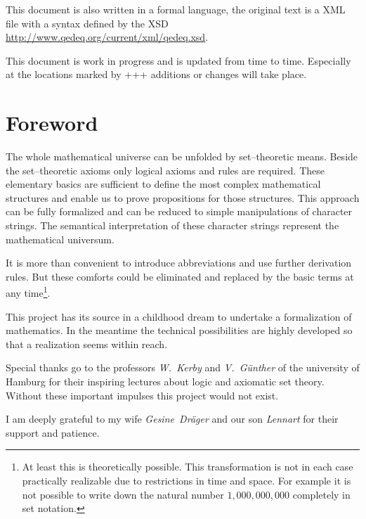 \documentclass[a4paper,german,10pt,twoside]{book}
\theoremstyle{definition}
\theoremstyle{remark}
\begin{document}
\par
This document is also written in a formal language, the original text is a XML file with a syntax defined by the XSD \url{http://www.qedeq.org/current/xml/qedeq.xsd}.

\par
This document is work in progress and is updated from time to time. Especially at the locations marked by {\glqq+++\grqq} additions or changes will take place.


\chapter*{Foreword} \label{chapter2} \hypertarget{chapter2}{}

The whole mathematical universe can be unfolded by set--theoretic means. Beside the set--theoretic axioms only logical axioms and rules are required. These elementary basics are sufficient to define the most complex mathematical structures and enable us to prove propositions for those structures. This approach can be fully formalized and can be reduced to simple manipulations of character strings. The semantical interpretation of these character strings represent the mathematical universum.

\par
It is more than convenient to introduce abbreviations and use further derivation rules. But these comforts could be eliminated and replaced by the basic terms at any time\footnote{At least this is theoretically possible. This transformation is not in each case practically realizable due to restrictions in time and space. For example it is not possible to write down the
natural number $1,000,000,000$ completely in set notation.}.

\par
This project has its source in a childhood dream to undertake a formalization of mathematics. In the meantime the technical possibilities are highly developed so that a realization seems within reach.

\par
Special thanks go to the professors \emph{W.~Kerby} and \emph{V.~G{\"u}nther} of the university of Hamburg for their inspiring lectures about logic and axiomatic set theory. Without these important impulses this project would not exist.

\par
I am deeply grateful to my wife \emph{Gesine~Dr{\"a}ger} and our son \emph{Lennart} for their support and patience.          
\end{document}
